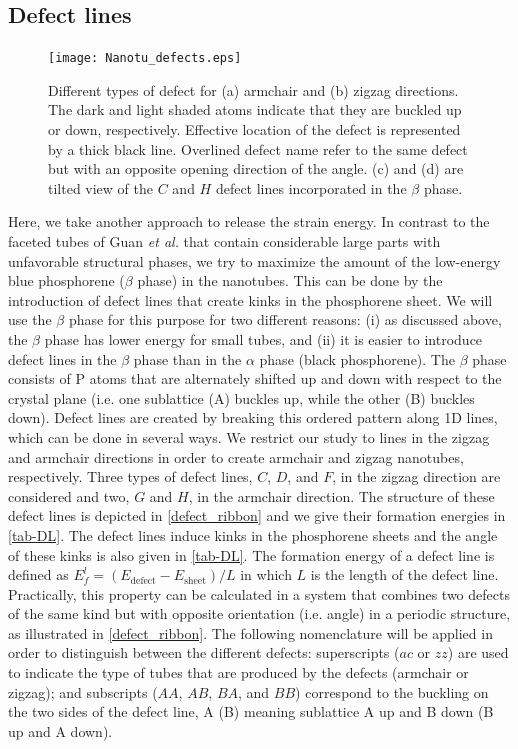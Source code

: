 \subsection{Defect lines} \label{natu_DL}

\begin{figure}[htb]
\centering
\texttt{[image: Nanotu\_defects.eps]}%
\caption{Different types of defect for (a) armchair and (b) zigzag directions. The dark and light shaded atoms indicate that they are buckled up or down, respectively. Effective location of the defect is represented by a thick black line. Overlined defect name refer to the same defect but with an opposite opening direction of the angle. (c) and (d) are tilted view of the $C$ and $H$ defect lines incorporated in the $\beta$ phase.\label{defect_ribbon}}
\end{figure}

Here, we take another approach to release the strain energy. In contrast to the faceted tubes of Guan \textit{et al.}\cite{Guan2014a} that contain considerable large parts with unfavorable structural phases, we try to maximize the amount of the low-energy blue phosphorene ($\beta$ phase) in the nanotubes. This can be done by the introduction of defect lines that create kinks in the phosphorene sheet. We will use the $\beta$ phase for this purpose for two different reasons: (i) as discussed above, the $\beta$ phase has lower energy for small tubes, and (ii) it is easier to introduce defect lines in the $\beta$ phase than in the $\alpha$ phase (black phosphorene). The $\beta$ phase consists of P atoms that are alternately shifted up and down with respect to the crystal plane (i.e. one sublattice (A) buckles up, while the other (B) buckles down). Defect lines are created by breaking this ordered pattern along 1D lines, which can be done in several ways. We restrict our study to lines in the zigzag and armchair directions in order to create armchair and zigzag nanotubes, respectively. Three types of defect lines, $C$, $D$, and $F$, in the zigzag direction are considered and two, $G$ and $H$, in the armchair direction. The structure of these defect lines is depicted in \autoref{defect_ribbon} and we give their formation energies in  \autoref{tab-DL}. The defect lines induce kinks in the phosphorene sheets and the angle of these kinks is also given in \autoref{tab-DL}. The formation energy of a defect line is defined as  $E_f^l=(E_{\text{defect}}-E_{\text{sheet}})/L$ in which $L$ is the length of the defect line. Practically, this property can be calculated in a system that combines two defects of the same kind but with opposite orientation (i.e. angle) in a periodic structure, as illustrated in \autoref{defect_ribbon}. The following nomenclature will be applied in order to distinguish between the different defects: superscripts ($ac$ or $zz$) are used to indicate the type of tubes that are produced by the defects (armchair or zigzag); and  subscripts ($AA$, $AB$, $BA$, and $BB$) correspond to the buckling on the two sides of the defect line, A (B) meaning sublattice A up and B down (B up and A down). 

